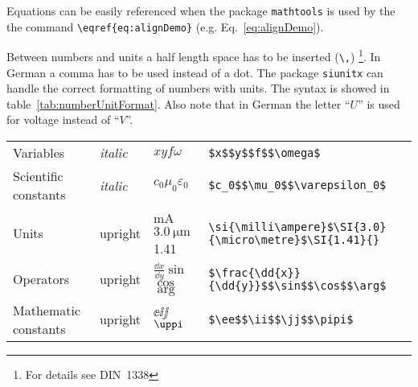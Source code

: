 	Equations can be easily referenced when the package \verb|mathtools| is used by the the command \verb|\eqref{eq:alignDemo}| (e.g. Eq.~\eqref{eq:alignDemo}).
	
	Between numbers and units a half length space has to be inserted (\verb|\,|) \footnote{For details see DIN~1338}. In German a comma has to be used instead of a dot. The package \verb|siunitx| can handle the correct formatting of numbers with units. The syntax is showed in table~\ref{tab:numberUnitFormat}. Also note that in German the letter \enquote{$U$} is used for voltage instead of \enquote{$V$}.
	
	\begin{table}
		\centering
		\caption{Number- and Unit formatting}
		\label{tab:numberUnitFormat}
		\begin{longtable}{p{}p{}p{}p{}}
			\toprule
			Variables & \textit{italic} & $x$\newline $y$\newline $f$\newline $\omega$ & \verb|$x$|\newline \verb|$y$|\newline \verb|$f$|\newline \verb|$\omega$|\\
			Scientific constants & \textit{italic} & $c_0$\newline $\mu_0$\newline $\varepsilon_0$ & \verb|$c_0$|\newline \verb|$\mu_0$|\newline \verb|$\varepsilon_0$|\\
			Units & upright & \si{\milli\ampere}\newline $\SI{3.0}{\micro\metre}$\newline \SI{1.41}{} & \verb|\si{\milli\ampere}|\newline \verb|$\SI{3.0}{\micro\metre}$|\newline \verb|\SI{1.41}{}|\\
			Operators & upright & $\frac{\dd{x}}{\dd{y}}$\newline $\sin$\newline $\cos$\newline $\arg$ & \verb|$\frac{\dd{x}}{\dd{y}}$|\newline \verb|$\sin$|\newline \verb|$\cos$|\newline \verb|$\arg$|\\
			Mathematic constants & upright & $\ee$\newline $\ii$\newline $\jj$\newline $\pipi$ & \verb|$\ee$|\newline \verb|$\ii$|\newline \verb|$\jj$|\newline \verb|$\pipi$| \\
			\bottomrule
		\end{longtable}
	\end{table}

